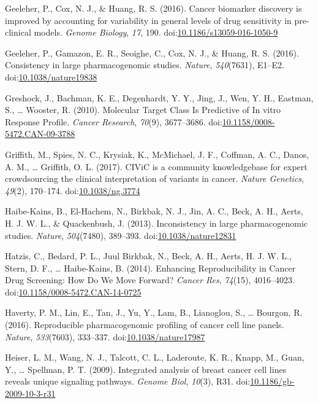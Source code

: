 \documentclass[man,floatsintext]{apa6}
\begin{document}
\hypertarget{ref-geeleher2016}{}
Geeleher, P., Cox, N. J., \& Huang, R. S. (2016). Cancer biomarker
discovery is improved by accounting for variability in general levels of
drug sensitivity in pre-clinical models. \emph{Genome Biology},
\emph{17}, 190.
doi:\href{https://doi.org/10.1186/s13059-016-1050-9}{10.1186/s13059-016-1050-9}

\hypertarget{ref-geeleher2016a}{}
Geeleher, P., Gamazon, E. R., Seoighe, C., Cox, N. J., \& Huang, R. S.
(2016). Consistency in large pharmacogenomic studies. \emph{Nature},
\emph{540}(7631), E1--E2.
doi:\href{https://doi.org/10.1038/nature19838}{10.1038/nature19838}

\hypertarget{ref-greshock2010}{}
Greshock, J., Bachman, K. E., Degenhardt, Y. Y., Jing, J., Wen, Y. H.,
Eastman, S., \ldots{} Wooster, R. (2010). Molecular Target Class Is
Predictive of In vitro Response Profile. \emph{Cancer Research},
\emph{70}(9), 3677--3686.
doi:\href{https://doi.org/10.1158/0008-5472.CAN-09-3788}{10.1158/0008-5472.CAN-09-3788}

\hypertarget{ref-griffith2017}{}
Griffith, M., Spies, N. C., Krysiak, K., McMichael, J. F., Coffman, A.
C., Danos, A. M., \ldots{} Griffith, O. L. (2017). CIViC is a community
knowledgebase for expert crowdsourcing the clinical interpretation of
variants in cancer. \emph{Nature Genetics}, \emph{49}(2), 170--174.
doi:\href{https://doi.org/10.1038/ng.3774}{10.1038/ng.3774}

\hypertarget{ref-haibe-kains2013}{}
Haibe-Kains, B., El-Hachem, N., Birkbak, N. J., Jin, A. C., Beck, A. H.,
Aerts, H. J. W. L., \& Quackenbush, J. (2013). Inconsistency in large
pharmacogenomic studies. \emph{Nature}, \emph{504}(7480), 389--393.
doi:\href{https://doi.org/10.1038/nature12831}{10.1038/nature12831}

\hypertarget{ref-hatzis2014}{}
Hatzis, C., Bedard, P. L., Juul Birkbak, N., Beck, A. H., Aerts, H. J.
W. L., Stern, D. F., \ldots{} Haibe-Kains, B. (2014). Enhancing
Reproducibility in Cancer Drug Screening: How Do We Move Forward?
\emph{Cancer Res}, \emph{74}(15), 4016--4023.
doi:\href{https://doi.org/10.1158/0008-5472.CAN-14-0725}{10.1158/0008-5472.CAN-14-0725}

\hypertarget{ref-haverty2016}{}
Haverty, P. M., Lin, E., Tan, J., Yu, Y., Lam, B., Lianoglou, S.,
\ldots{} Bourgon, R. (2016). Reproducible pharmacogenomic profiling of
cancer cell line panels. \emph{Nature}, \emph{533}(7603), 333--337.
doi:\href{https://doi.org/10.1038/nature17987}{10.1038/nature17987}

\hypertarget{ref-heiser2009}{}
Heiser, L. M., Wang, N. J., Talcott, C. L., Laderoute, K. R., Knapp, M.,
Guan, Y., \ldots{} Spellman, P. T. (2009). Integrated analysis of breast
cancer cell lines reveals unique signaling pathways. \emph{Genome Biol},
\emph{10}(3), R31.
doi:\href{https://doi.org/10.1186/gb-2009-10-3-r31}{10.1186/gb-2009-10-3-r31}
\end{document}
